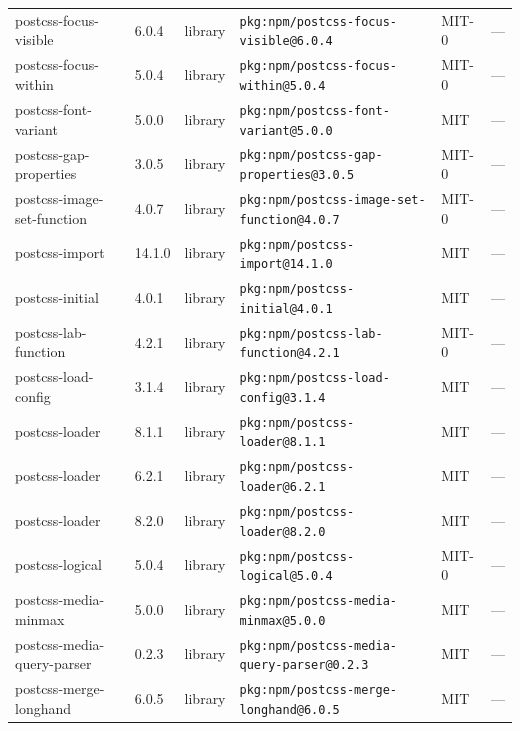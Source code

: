 \documentclass[11pt,a4paper]{article}
\begin{document}
\begin{longtable}{|p{4cm}|p{2cm}|p{1.6cm}|p{5cm}|p{1.5cm}|p{3.5cm}|}
\raggedright postcss-focus-visible & 6.0.4 & library & \small\texttt{pkg:npm/postcss-focus-visible@6.0.4} & MIT-0 & \small — \\
\raggedright postcss-focus-within & 5.0.4 & library & \small\texttt{pkg:npm/postcss-focus-within@5.0.4} & MIT-0 & \small — \\
\raggedright postcss-font-variant & 5.0.0 & library & \small\texttt{pkg:npm/postcss-font-variant@5.0.0} & MIT & \small — \\
\raggedright postcss-gap-properties & 3.0.5 & library & \small\texttt{pkg:npm/postcss-gap-properties@3.0.5} & MIT-0 & \small — \\
\raggedright postcss-image-set-function & 4.0.7 & library & \small\texttt{pkg:npm/postcss-image-set-function@4.0.7} & MIT-0 & \small — \\
\raggedright postcss-import & 14.1.0 & library & \small\texttt{pkg:npm/postcss-import@14.1.0} & MIT & \small — \\
\raggedright postcss-initial & 4.0.1 & library & \small\texttt{pkg:npm/postcss-initial@4.0.1} & MIT & \small — \\
\raggedright postcss-lab-function & 4.2.1 & library & \small\texttt{pkg:npm/postcss-lab-function@4.2.1} & MIT-0 & \small — \\
\raggedright postcss-load-config & 3.1.4 & library & \small\texttt{pkg:npm/postcss-load-config@3.1.4} & MIT & \small — \\
\raggedright postcss-loader & 8.1.1 & library & \small\texttt{pkg:npm/postcss-loader@8.1.1} & MIT & \small — \\
\raggedright postcss-loader & 6.2.1 & library & \small\texttt{pkg:npm/postcss-loader@6.2.1} & MIT & \small — \\
\raggedright postcss-loader & 8.2.0 & library & \small\texttt{pkg:npm/postcss-loader@8.2.0} & MIT & \small — \\
\raggedright postcss-logical & 5.0.4 & library & \small\texttt{pkg:npm/postcss-logical@5.0.4} & MIT-0 & \small — \\
\raggedright postcss-media-minmax & 5.0.0 & library & \small\texttt{pkg:npm/postcss-media-minmax@5.0.0} & MIT & \small — \\
\raggedright postcss-media-query-parser & 0.2.3 & library & \small\texttt{pkg:npm/postcss-media-query-parser@0.2.3} & MIT & \small — \\
\raggedright postcss-merge-longhand & 6.0.5 & library & \small\texttt{pkg:npm/postcss-merge-longhand@6.0.5} & MIT & \small — \\

\end{longtable}
\end{document}
